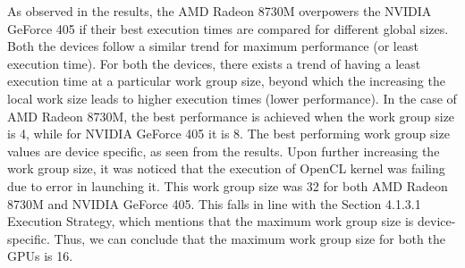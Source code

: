 As observed in the results, the AMD Radeon 8730M overpowers the NVIDIA GeForce 405 if their best execution times are compared for different global sizes. Both the devices follow a similar trend for maximum performance (or least execution time). For both the devices, there exists a trend of having a least execution time at a particular work group size, beyond which the increasing the local work size leads to higher execution times (lower performance). In the case of AMD Radeon 8730M, the best performance is achieved when the work group size is 4, while for NVIDIA GeForce 405 it is 8. The best performing work group size values are device specific, as seen from the results. \newline\newline
Upon further increasing the work group size, it was noticed that the execution of OpenCL kernel was failing due to error in launching it. This work group size was 32 for both AMD Radeon 8730M and NVIDIA GeForce 405. This falls in line with the Section 4.1.3.1 Execution Strategy, which mentions that the maximum work group size is device-specific. Thus, we can conclude that the maximum work group size for both the GPUs is 16. \newline
